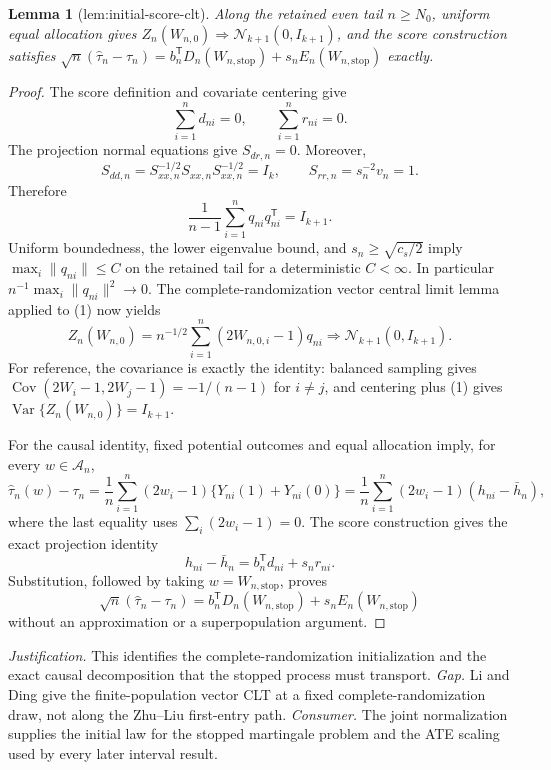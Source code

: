 \documentclass{article}
\newtheorem{lemma}{Lemma}
\begin{document}
\begin{lemma}[lem:initial-score-clt]\label{lem:initial-score-clt}
Along the retained even tail \(n\ge N_0\), uniform equal allocation gives \(Z_n(W_{n,0})\Rightarrow\mathcal N_{k+1}(0,I_{k+1})\), and the score construction satisfies \(\sqrt n(\widehat\tau_n-\tau_n)=b_n^{\mathsf T}D_n(W_{n,\mathrm{stop}})+s_nE_n(W_{n,\mathrm{stop}})\) exactly.
\end{lemma}
\begin{proof}
The score definition and covariate centering give
\[
 \sum_{i=1}^n d_{ni}=0,\qquad \sum_{i=1}^n r_{ni}=0.
\]
The projection normal equations give \(S_{dr,n}=0\).  Moreover,
\[
 S_{dd,n}=S_{xx,n}^{-1/2}S_{xx,n}S_{xx,n}^{-1/2}=I_k,
 \qquad S_{rr,n}=s_n^{-2}v_n=1.
\]
Therefore
\[
 \frac1{n-1}\sum_{i=1}^n q_{ni}q_{ni}^{\mathsf T}=I_{k+1}. \tag{1}
\]
Uniform boundedness, the lower eigenvalue bound, and \(s_n\ge\sqrt{c_s/2}\) imply \(\max_i\|q_{ni}\|\le C\) on the retained tail for a deterministic \(C<\infty\).  In particular \(n^{-1}\max_i\|q_{ni}\|^2\to0\).  The complete-randomization vector central limit lemma applied to (1) now yields
\[
 Z_n(W_{n,0})=n^{-1/2}\sum_{i=1}^n(2W_{n,0,i}-1)q_{ni}
 \Rightarrow \mathcal N_{k+1}(0,I_{k+1}).
\]
For reference, the covariance is exactly the identity: balanced sampling gives \(\operatorname{Cov}(2W_i-1,2W_j-1)=-1/(n-1)\) for \(i\ne j\), and centering plus (1) gives \(\operatorname{Var}\{Z_n(W_{n,0})\}=I_{k+1}\).

For the causal identity, fixed potential outcomes and equal allocation imply, for every \(w\in\mathcal A_n\),
\[
 \widehat\tau_n(w)-\tau_n
 =\frac1n\sum_{i=1}^n(2w_i-1)\{Y_{ni}(1)+Y_{ni}(0)\}
 =\frac1n\sum_{i=1}^n(2w_i-1)(h_{ni}-\bar h_n),
\]
where the last equality uses \(\sum_i(2w_i-1)=0\).  The score construction gives the exact projection identity
\[
 h_{ni}-\bar h_n=b_n^{\mathsf T}d_{ni}+s_nr_{ni}.
\]
Substitution, followed by taking \(w=W_{n,\mathrm{stop}}\), proves
\[
 \sqrt n(\widehat\tau_n-\tau_n)
 =b_n^{\mathsf T}D_n(W_{n,\mathrm{stop}})+s_nE_n(W_{n,\mathrm{stop}})
\]
without an approximation or a superpopulation argument.
\end{proof}
\par\smallskip\noindent \textit{Justification.} This identifies the complete-randomization initialization and the exact causal decomposition that the stopped process must transport. \textit{Gap.} Li and Ding give the finite-population vector CLT at a fixed complete-randomization draw, not along the Zhu--Liu first-entry path. \textit{Consumer.} The joint normalization supplies the initial law for the stopped martingale problem and the ATE scaling used by every later interval result.
\end{document}
